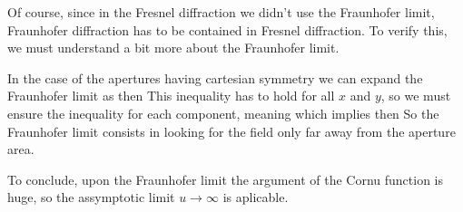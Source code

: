 \documentclass[oneside, 12pt, notitlepage]{book}
\begin{document}
Of course, since in the Fresnel diffraction we didn't use the Fraunhofer limit, Fraunhofer diffraction has to be contained in Fresnel diffraction. To verify this, we must understand a bit more about the Fraunhofer limit.\par

In the case of the apertures having cartesian symmetry we can expand the Fraunhofer limit as
then
This inequality has to hold for all \(x\) and \(y\), so we must ensure the inequality for each component, meaning
which implies
then
So the Fraunhofer limit consists in looking for the field only far away from the aperture area.\par

To conclude, upon the Fraunhofer limit the argument of the Cornu function is huge, so the assymptotic limit \(u\rightarrow \infty\) is aplicable.\par












\backmatter

\end{document}
